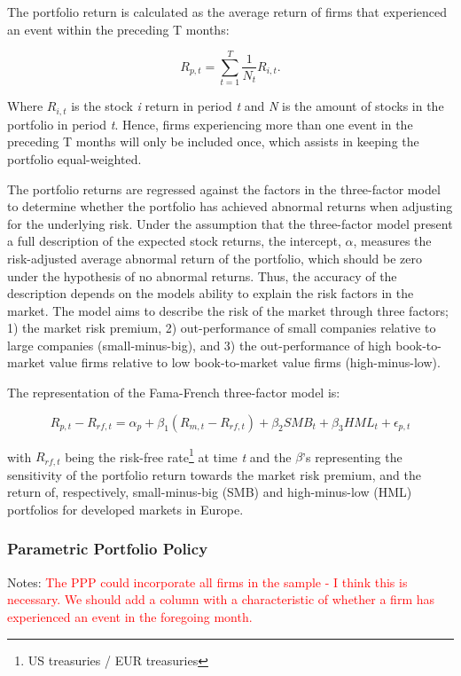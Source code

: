 The portfolio return is calculated as the average return of firms that experienced an event within the preceding T months:

\begin{equation}
    R_{p,t} = \sum_{t = 1} ^{T} \frac{1}{N_t} R_{i,t}.
\end{equation}

Where $R_{i,t}$ is the stock \textit{i} return in period \textit{t} and \textit{N} is the amount of stocks in the portfolio in period \textit{t}. Hence, firms experiencing more than one event in the preceding T months will only be included once, which assists in keeping the portfolio equal-weighted. 

The portfolio returns are regressed against the factors in the \cite{Fama_french_3fac} three-factor model to determine whether the portfolio has achieved abnormal returns when adjusting for the underlying risk. Under the assumption that the three-factor model present a full description of the expected stock returns, the intercept, $\alpha$, measures the risk-adjusted average abnormal return of the portfolio, which should be zero under the hypothesis of no abnormal returns. Thus, the accuracy of the description depends on the models ability to explain the risk factors in the market. The model aims to describe the risk of the market through three factors; 1) the market risk premium, 2) out-performance of small companies relative to large companies (small-minus-big), and 3) the out-performance of high book-to-market value firms  relative to low book-to-market value firms (high-minus-low). 

The representation of the Fama-French three-factor model is:

\begin{equation}
    R_{p,t} - R_{rf,t} = \alpha_p + \beta_1(R_{m,t} - R_{rf,t}) + \beta_2 SMB_t + \beta_3 HML_t + \epsilon_{p,t} 
\end{equation}

with $R_{rf,t}$ being the risk-free rate\footnote{US treasuries / EUR treasuries} at time \textit{t} and the $\beta$'s representing the sensitivity of the portfolio return towards the market risk premium, and the return of, respectively, small-minus-big (SMB) and high-minus-low (HML) portfolios for developed markets in Europe.   

\subsubsection{Parametric Portfolio Policy}

Notes:
\textcolor{red}{The PPP could incorporate all firms in the sample - I think this is necessary. We should add a column with a characteristic of whether a firm has experienced an event in the foregoing month.}
